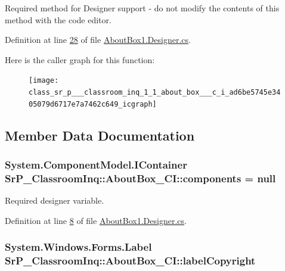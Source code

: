 \-Required method for \-Designer support -\/ do not modify the contents of this method with the code editor. 



\-Definition at line \hyperlink{_about_box1_8_designer_8cs_source_l00028}{28} of file \hyperlink{_about_box1_8_designer_8cs_source}{\-About\-Box1.\-Designer.\-cs}.



\-Here is the caller graph for this function\-:\nopagebreak
\begin{figure}[H]
\begin{center}
\leavevmode
\texttt{[image: class\_sr\_p\_\_\_classroom\_inq\_1\_1\_about\_box\_\_\_c\_i\_ad6be5745e3405079d6717e7a7462c649\_icgraph]}
\end{center}
\end{figure}




\subsection{\-Member \-Data \-Documentation}
\hypertarget{class_sr_p___classroom_inq_1_1_about_box___c_i_a988e74f2099fc5a7a3c4acd218b4c471}{
\subsubsection[{components}]{\setlength{\rightskip}{0pt plus 5cm}\-System.\-Component\-Model.\-I\-Container {\bf \-Sr\-P\-\_\-\-Classroom\-Inq\-::\-About\-Box\-\_\-\-C\-I\-::components} = null}}
\label{class_sr_p___classroom_inq_1_1_about_box___c_i_a988e74f2099fc5a7a3c4acd218b4c471}


\-Required designer variable. 



\-Definition at line \hyperlink{_about_box1_8_designer_8cs_source_l00008}{8} of file \hyperlink{_about_box1_8_designer_8cs_source}{\-About\-Box1.\-Designer.\-cs}.

\hypertarget{class_sr_p___classroom_inq_1_1_about_box___c_i_ab98fc181f4cf9c79b0c1459c04caeb70}{
\subsubsection[{label\-Copyright}]{\setlength{\rightskip}{0pt plus 5cm}\-System.\-Windows.\-Forms.\-Label {\bf \-Sr\-P\-\_\-\-Classroom\-Inq\-::\-About\-Box\-\_\-\-C\-I\-::label\-Copyright}}}
\label{class_sr_p___classroom_inq_1_1_about_box___c_i_ab98fc181f4cf9c79b0c1459c04caeb70}


